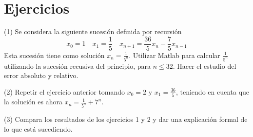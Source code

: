 \section*{Ejercicios}
\noindent (1) Se considera la siguiente sucesión definida por recursión
\[x_0 = 1 \quad x_1 = \frac{1}{5} \quad x_{n+1} = \frac{36}{5} x_n - \frac{7}{5} x_{n-1}\]
Esta sucesión tiene como solución $x_n = \frac{1}{5^n}$. Utilizar Matlab para calcular $\frac{1}{5^n}$ utilizando la sucesión recusiva del principio, para $n \leq 32$. Hacer el estudio del error absoluto y  relativo.

\noindent (2) Repetir el ejercicio anterior tomando $x_0 = 2$ y $x_1 = \frac{36}{5}$, teniendo en cuenta que la solución es ahora $x_n = \frac{1}{5^n} + 7^n$.

\noindent (3) Compara los resultados de los ejercicios 1 y 2 y dar una explicación formal de lo que está sucediendo.